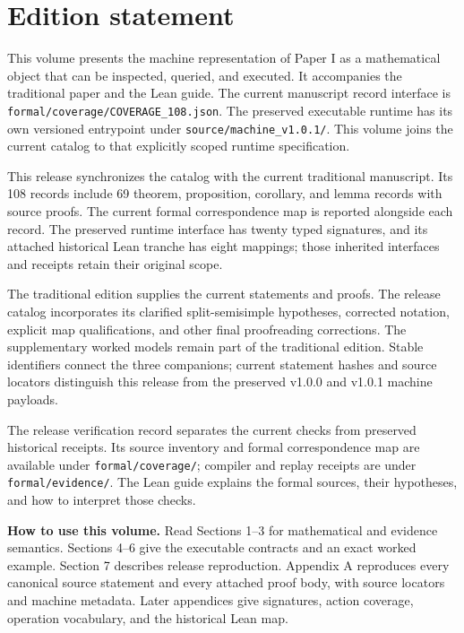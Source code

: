 \documentclass[a4paper,11pt]{article}
\begin{document}
\KomorebiCover


\section*{Edition statement}
This volume presents the machine representation of Paper I as a mathematical object that can be inspected, queried, and executed. It accompanies the traditional paper and the Lean guide. The current manuscript record interface is \nolinkurl{formal/coverage/COVERAGE_108.json}. The preserved executable runtime has its own versioned entrypoint under \nolinkurl{source/machine_v1.0.1/}. This volume joins the current catalog to that explicitly scoped runtime specification.

This release synchronizes the catalog with the current traditional manuscript. Its 108 records include 69 theorem, proposition, corollary, and lemma records with source proofs. The current formal correspondence map is reported alongside each record. The preserved runtime interface has twenty typed signatures, and its attached historical Lean tranche has eight mappings; those inherited interfaces and receipts retain their original scope.

The traditional edition supplies the current statements and proofs. The release catalog incorporates its clarified split-semisimple hypotheses, corrected notation, explicit map qualifications, and other final proofreading corrections. The supplementary worked models remain part of the traditional edition. Stable identifiers connect the three companions; current statement hashes and source locators distinguish this release from the preserved v1.0.0 and v1.0.1 machine payloads.

The release verification record separates the current checks from preserved historical receipts. Its source inventory and formal correspondence map are available under \nolinkurl{formal/coverage/}; compiler and replay receipts are under \nolinkurl{formal/evidence/}. The Lean guide explains the formal sources, their hypotheses, and how to interpret those checks.

\textbf{How to use this volume.} Read Sections 1--3 for mathematical and evidence semantics. Sections 4--6 give the executable contracts and an exact worked example. Section 7 describes release reproduction. Appendix A reproduces every canonical source statement and every attached proof body, with source locators and machine metadata. Later appendices give signatures, action coverage, operation vocabulary, and the historical Lean map.
\clearpage\tableofcontents\clearpage
\end{document}
